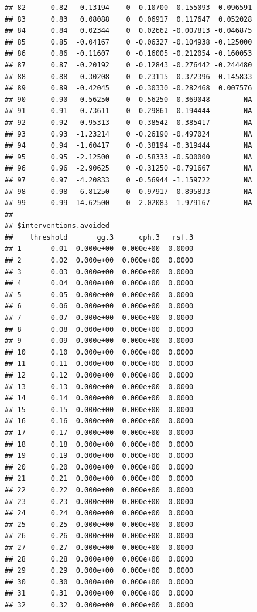\documentclass{article}\usepackage[]{graphicx}\usepackage[]{color}
\makeatletter
\newenvironment{kframe}{%
 \def\at@end@of@kframe{}%
 \ifinner\ifhmode%
  \def\at@end@of@kframe{\end{minipage}}%
  \begin{minipage}{\columnwidth}%
 \fi\fi%
 \def\FrameCommand##1{\hskip\@totalleftmargin \hskip-\fboxsep
 \colorbox{shadecolor}{##1}\hskip-\fboxsep
     \hskip-\linewidth \hskip-\@totalleftmargin \hskip\columnwidth}%
 \MakeFramed {\advance\hsize-\width
   \@totalleftmargin\z@ \linewidth\hsize
   \@setminipage}}%
 {\par\unskip\endMakeFramed%
 \at@end@of@kframe}
\newenvironment{knitrout}{}{} %
\makeatother
\begin{document}
\begin{knitrout}
\begin{kframe}
\begin{verbatim}
## 82      0.82   0.13194    0  0.10700  0.155093  0.096591
## 83      0.83   0.08088    0  0.06917  0.117647  0.052028
## 84      0.84   0.02344    0  0.02662 -0.007813 -0.046875
## 85      0.85  -0.04167    0 -0.06327 -0.104938 -0.125000
## 86      0.86  -0.11607    0 -0.16005 -0.212054 -0.160053
## 87      0.87  -0.20192    0 -0.12843 -0.276442 -0.244480
## 88      0.88  -0.30208    0 -0.23115 -0.372396 -0.145833
## 89      0.89  -0.42045    0 -0.30330 -0.282468  0.007576
## 90      0.90  -0.56250    0 -0.56250 -0.369048        NA
## 91      0.91  -0.73611    0 -0.29861 -0.194444        NA
## 92      0.92  -0.95313    0 -0.38542 -0.385417        NA
## 93      0.93  -1.23214    0 -0.26190 -0.497024        NA
## 94      0.94  -1.60417    0 -0.38194 -0.319444        NA
## 95      0.95  -2.12500    0 -0.58333 -0.500000        NA
## 96      0.96  -2.90625    0 -0.31250 -0.791667        NA
## 97      0.97  -4.20833    0 -0.56944 -1.159722        NA
## 98      0.98  -6.81250    0 -0.97917 -0.895833        NA
## 99      0.99 -14.62500    0 -2.02083 -1.979167        NA
## 
## $interventions.avoided
##    threshold       gg.3      cph.3   rsf.3
## 1       0.01  0.000e+00  0.000e+00  0.0000
## 2       0.02  0.000e+00  0.000e+00  0.0000
## 3       0.03  0.000e+00  0.000e+00  0.0000
## 4       0.04  0.000e+00  0.000e+00  0.0000
## 5       0.05  0.000e+00  0.000e+00  0.0000
## 6       0.06  0.000e+00  0.000e+00  0.0000
## 7       0.07  0.000e+00  0.000e+00  0.0000
## 8       0.08  0.000e+00  0.000e+00  0.0000
## 9       0.09  0.000e+00  0.000e+00  0.0000
## 10      0.10  0.000e+00  0.000e+00  0.0000
## 11      0.11  0.000e+00  0.000e+00  0.0000
## 12      0.12  0.000e+00  0.000e+00  0.0000
## 13      0.13  0.000e+00  0.000e+00  0.0000
## 14      0.14  0.000e+00  0.000e+00  0.0000
## 15      0.15  0.000e+00  0.000e+00  0.0000
## 16      0.16  0.000e+00  0.000e+00  0.0000
## 17      0.17  0.000e+00  0.000e+00  0.0000
## 18      0.18  0.000e+00  0.000e+00  0.0000
## 19      0.19  0.000e+00  0.000e+00  0.0000
## 20      0.20  0.000e+00  0.000e+00  0.0000
## 21      0.21  0.000e+00  0.000e+00  0.0000
## 22      0.22  0.000e+00  0.000e+00  0.0000
## 23      0.23  0.000e+00  0.000e+00  0.0000
## 24      0.24  0.000e+00  0.000e+00  0.0000
## 25      0.25  0.000e+00  0.000e+00  0.0000
## 26      0.26  0.000e+00  0.000e+00  0.0000
## 27      0.27  0.000e+00  0.000e+00  0.0000
## 28      0.28  0.000e+00  0.000e+00  0.0000
## 29      0.29  0.000e+00  0.000e+00  0.0000
## 30      0.30  0.000e+00  0.000e+00  0.0000
## 31      0.31  0.000e+00  0.000e+00  0.0000
## 32      0.32  0.000e+00  0.000e+00  0.0000

\end{verbatim}
\end{kframe}
\end{knitrout}
\end{document}
